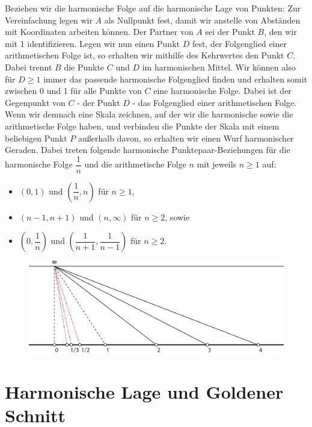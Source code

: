 \documentclass[12pt,a4paper]{article}
\begin{document}
Beziehen wir die harmonische Folge auf die harmonische Lage von Punkten: Zur Vereinfachung legen wir $A$ als Nullpunkt fest, damit wir anstelle von Abständen mit Koordinaten arbeiten können. Der Partner von $A$ sei der Punkt $B$, den wir mit 1 identifizieren. Legen wir nun einen Punkt $D$ fest, der Folgenglied einer arithmetischen Folge ist, so erhalten wir mithilfe des Kehrwertes den Punkt $C$. Dabei trennt $B$ die Punkte $C$ und $D$ im harmonischen Mittel. Wir können also für $D \geq 1$ immer das passende harmonische Folgenglied finden und erhalten somit zwischen 0 und 1 für alle Punkte von $C$ eine harmonische Folge. Dabei ist der Gegenpunkt von $C$ - der Punkt $D$ - das Folgenglied einer arithmetischen Folge. Wenn wir demnach eine Skala zeichnen, auf der wir die harmonische sowie die arithmetische Folge haben, und verbinden die Punkte der Skala mit einem beliebigen Punkt $P$ außerhalb davon, so erhalten wir einen Wurf harmonischer Geraden. Dabei treten folgende harmonische Punktepaar-Beziehungen für die harmonische Folge $\dfrac{1}{n}$ und die arithmetische Folge $n$ mit jeweils $n \geq 1$ auf:

\begin{itemize}
\item $\left(0, 1\right)$ und $\left(\dfrac{1}{n}, n\right)$ für $n \geq 1$,
\item $\left(n-1, n+1\right)$ und $\left(n, \infty\right)$ für $n \geq 2$, sowie
\item $\left(0, \dfrac{1}{n}\right)$ und $\left(\dfrac{1}{n+1}, \dfrac{1}{n-1}\right)$ für $n \geq 2$.
\end{itemize}

\begin{figure}[htbp]
\includegraphics[width=\textwidth]{Bilder/folge.png}
\end{figure}

\newpage
\section{Harmonische Lage und Goldener Schnitt}
\end{document}
